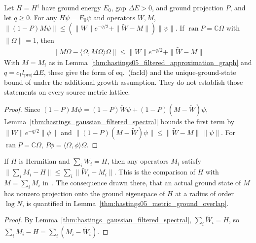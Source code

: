 \begin{lemma}
    \label{thm:hastings05_facld}
    \leanok
    Let $H=H^\dagger$ have ground energy $E_0$, gap $\Delta E>0$, and ground
    projection $P$, and let $q\ge0$. For any $H\psi=E_0\psi$ and operators
    $W,M$, $\|(1-P)M\psi\|\le(\|W\|e^{-q/2}+\|\widetilde W-M\|)\|\psi\|$. If
    $\operatorname{ran}P=\mathbb C\Omega$ with $\|\Omega\|=1$, then
    \begin{align}
        \|M\Omega-\langle\Omega,M\Omega\rangle\Omega\|
        \le\|W\|e^{-q/2}+\|\widetilde W-M\|
        \label{eq:hastings05_filtered_ground_vector}
    \end{align}
    With $M=M_i$ as in
    Lemma~\ref{thm:hastings05_filtered_approximation_graph} and
    $q=c_1l_{\mathrm{proj}}\Delta E$, these give the form of eq.~(facld)
    and the unique-ground-state bound of
    \cite[lines 322--348 and 375--387]{Hastings2006Solving} under the
    additional growth assumption. They do not establish those statements
    on every source metric lattice\cite{gap:hastings05_geometric_growth_scope}.
\end{lemma}
\begin{proof}\leanok
    Since $(1-P)M\psi=(1-P)\widetilde W\psi+(1-P)(M-\widetilde W)\psi$,
    Lemma~\ref{thm:hastings_gaussian_filtered_spectral} bounds the first term
    by $\|W\|e^{-q/2}\|\psi\|$ and $\|(1-P)(M-\widetilde W)\psi\|\le\|\widetilde W-M\|\,\|\psi\|$.
    For $\operatorname{ran}P=\mathbb C\Omega$, $P\phi=\langle\Omega,\phi\rangle\Omega$.
\end{proof}

\begin{lemma}
    \label{thm:hastings05_sum_approximation}
    \leanok
    If $H$ is Hermitian and $\sum_iW_i=H$, then any operators $M_i$ satisfy
    $\|\sum_iM_i-H\|\le\sum_i\|\widetilde W_i-M_i\|$. This is the comparison of
    $H$ with $M=\sum_iM_i$ in~\cite[lines 359--374]{Hastings2006Solving}. The
    consequence drawn there, that an actual ground state of $M$ has nonzero
    projection onto the ground eigenspace of $H$ at a radius of order
    $\log N$, is quantified in
    Lemma~\ref{thm:hastings05_metric_ground_overlap}.
\end{lemma}
\begin{proof}\leanok
    By Lemma~\ref{thm:hastings_gaussian_filtered_spectral},
    $\sum_i\widetilde W_i=H$, so $\sum_iM_i-H=\sum_i(M_i-\widetilde W_i)$.
\end{proof}


